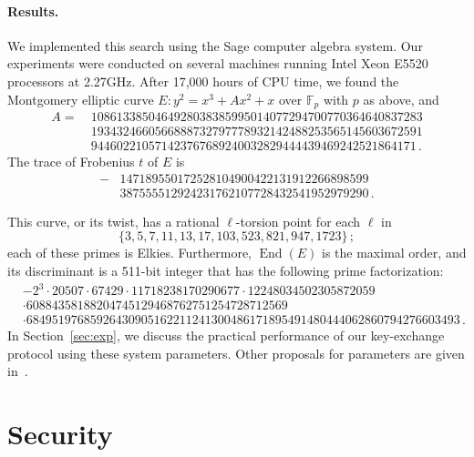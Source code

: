\documentclass{llncs}
\newcommand{\F}{\mathbb{F}}
\DeclareMathOperator{\End}{End}
\begin{document}
\paragraph{Results.}
We implemented this search using the Sage computer algebra system.
Our experiments were conducted on several machines running
Intel Xeon E5520 processors at 2.27GHz.
After 17,000 hours of CPU time, we found the Montgomery elliptic curve 
$
	E : y^2 = x^3 + A x^2 + x
$
over $\F_p$ with $p$ as above, and
\[
\begin{aligned}
A =\ 
& 1086133850464928038385995014077294700770364640837283 \\
& 1934324660566888732797778932142488253565145603672591 \\
& 944602210571423767689240032829444439469242521864171\,.
\end{aligned}
\]
The trace of Frobenius $t$ of $E$ is
\[
\begin{aligned}
-&147189550172528104900422131912266898599 \\
&387555512924231762107728432541952979290\,.
\end{aligned}
\]

This curve, or its twist, has a rational $\ell$-torsion point 
for each $\ell$ in
\[
  \{3, 5, 7, 11, 13, 17, 103, 523, 821, 947, 1723\}
  \,;
\]
each of these primes is Elkies.
Furthermore, $\End(E)$ is the maximal order, and its discriminant is
a 511-bit integer that has the following prime factorization:
\[
\begin{aligned}
& \scriptstyle -2^3 \cdot 20507 \cdot 67429 \cdot 11718238170290677 \cdot 12248034502305872059 \\
& \scriptstyle \cdot 60884358188204745129468762751254728712569\\
& \scriptstyle \cdot 68495197685926430905162211241300486171895491480444062860794276603493\,.
\end{aligned}
\]
In Section~\ref{sec:exp}, we discuss the practical performance
of our key-exchange protocol using these system parameters.
Other proposals for parameters are given in~\cite{memoire}.

\section{Security}
\label{sec:sec}
\end{document}
